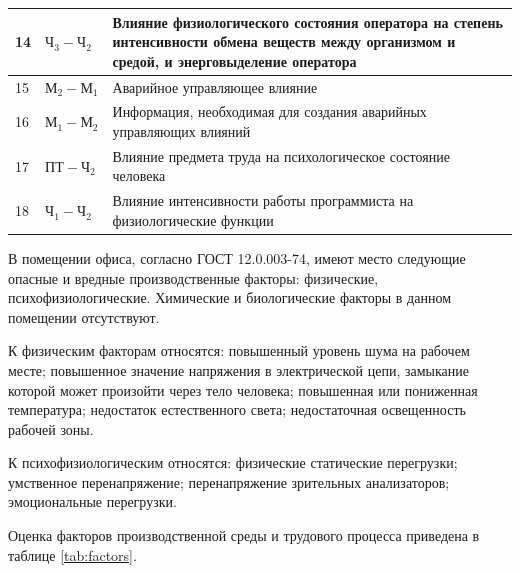 \begin{center}
\begin{longtable}{|p{1cm}|p{3cm}|p{12cm}|}
       \hline
       14 & \(\text{Ч}_3-\text{Ч}_2\) & Влияние физиологического состояния оператора на степень интенсивности обмена веществ
                                        между организмом и средой, и энерговыделение оператора \\
       \hline
       15 & \(\text{М}_2-\text{М}_1\) & Аварийное управляющее влияние \\
       \hline
       16 & \(\text{М}_1-\text{М}_2\) & Информация, необходимая для создания аварийных управляющих влияний \\
       \hline
       17 & \(\text{ПТ}-\text{Ч}_2 \) & Влияние предмета труда на психологическое состояние человека \\
       \hline
       18 & \(\text{Ч}_1-\text{Ч}_2\) & Влияние интенсивности работы программиста на физиологические функции \\
       \hline
   \end{longtable}
\end{center}

В помещении офиса, согласно ГОСТ 12.0.003-74, имеют место следующие опасные и вредные производственные факторы:
физические, психофизиологические. Химические и биологические факторы в данном помещении отсутствуют. 

К физическим факторам относятся: повышенный уровень шума на рабочем месте;
повышенное значение напряжения в электрической цепи, замыкание которой может
произойти через тело человека; повышенная или пониженная температура;
недостаток естественного света; недостаточная освещенность рабочей зоны. 

К психофизиологическим относятся: физические статические перегрузки; умственное перенапряжение; 
перенапряжение зрительных анализаторов; эмоциональные перегрузки.

Оценка факторов производственной среды и трудового процесса приведена в таблице \ref{tab:factors}.	

